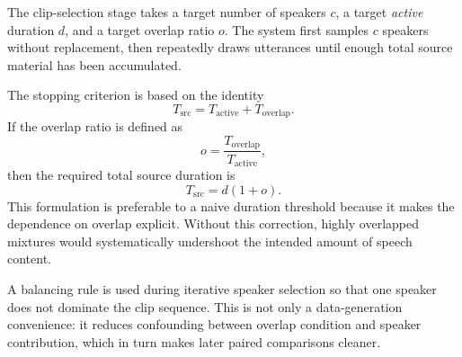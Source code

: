 The clip-selection stage takes a target number of speakers $c$, a target \emph{active} duration $d$, and a target overlap ratio $o$. The system first samples $c$ speakers without replacement, then repeatedly draws utterances until enough total source material has been accumulated.

The stopping criterion is based on the identity
\begin{equation}
T_{\mathrm{src}} = T_{\mathrm{active}} + T_{\mathrm{overlap}}.
\end{equation}
If the overlap ratio is defined as
\begin{equation}
 o = \frac{T_{\mathrm{overlap}}}{T_{\mathrm{active}}},
\end{equation}
then the required total source duration is
\begin{equation}
T_{\mathrm{src}} = d(1+o).
\end{equation}
This formulation is preferable to a naive duration threshold because it makes the dependence on overlap explicit. Without this correction, highly overlapped mixtures would systematically undershoot the intended amount of speech content.

A balancing rule is used during iterative speaker selection so that one speaker does not dominate the clip sequence. This is not only a data-generation convenience: it reduces confounding between overlap condition and speaker contribution, which in turn makes later paired comparisons cleaner.

